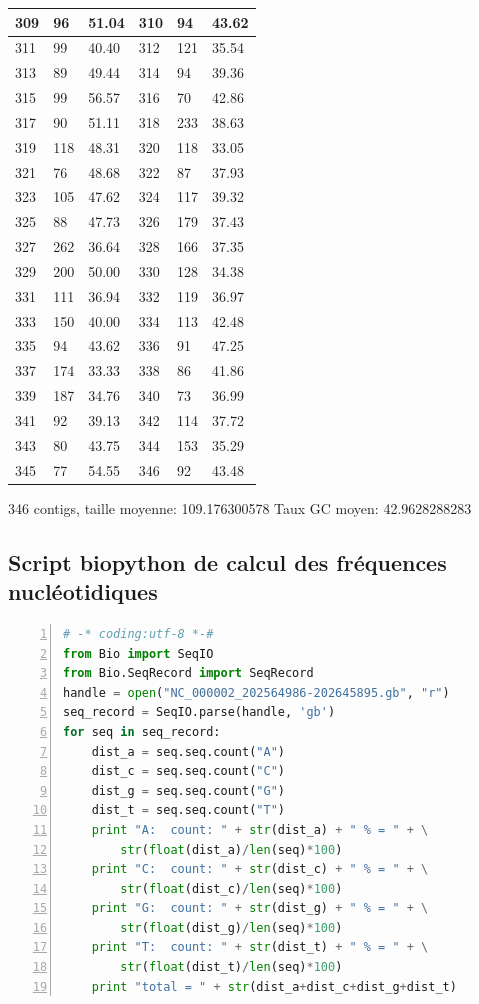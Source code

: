\documentclass[10.9pt]{article} %
\begin{document}
{\begin{longtable}{|p{2cm}|p{2cm}|p{2cm}|p{2cm}|p{2cm}|p{2cm}|}
\hline
309 & 96& 51.04 & 310 & 94& 43.62\\
\hline
311 & 99& 40.40 & 312 & 121& 35.54\\
\hline
313 & 89& 49.44 & 314 & 94& 39.36\\
\hline
315 & 99& 56.57 & 316 & 70& 42.86\\
\hline
317 & 90& 51.11 & 318 & 233& 38.63\\
\hline
319 & 118& 48.31 & 320 & 118& 33.05\\
\hline
321 & 76& 48.68 & 322 & 87& 37.93\\
\hline
323 & 105& 47.62 & 324 & 117& 39.32\\
\hline
325 & 88& 47.73 & 326 & 179& 37.43\\
\hline
327 & 262& 36.64 & 328 & 166& 37.35\\
\hline
329 & 200& 50.00 & 330 & 128& 34.38\\
\hline
331 & 111& 36.94 & 332 & 119& 36.97\\
\hline
333 & 150& 40.00 & 334 & 113& 42.48\\
\hline
335 & 94& 43.62 & 336 & 91& 47.25\\
\hline
337 & 174& 33.33 & 338 & 86& 41.86\\
\hline
339 & 187& 34.76 & 340 & 73& 36.99\\
\hline
341 & 92& 39.13 & 342 & 114& 37.72\\
\hline
343 & 80& 43.75 & 344 & 153& 35.29\\
\hline
345 & 77& 54.55 & 346 & 92& 43.48\\
\hline
\end{longtable}
}
346 contigs, taille moyenne: 109.176300578 Taux GC moyen: 42.9628288283



\subsection{Script biopython de calcul des fréquences nucléotidiques}\label{3}
\begin{lstlisting}[frame=single,numbers=left,language=Python]
# -* coding:utf-8 *-#
from Bio import SeqIO
from Bio.SeqRecord import SeqRecord
handle = open("NC_000002_202564986-202645895.gb", "r")
seq_record = SeqIO.parse(handle, 'gb')
for seq in seq_record:
    dist_a = seq.seq.count("A")
    dist_c = seq.seq.count("C")
    dist_g = seq.seq.count("G")
    dist_t = seq.seq.count("T")
    print "A:  count: " + str(dist_a) + " % = " + \
        str(float(dist_a)/len(seq)*100)
    print "C:  count: " + str(dist_c) + " % = " + \
        str(float(dist_c)/len(seq)*100)
    print "G:  count: " + str(dist_g) + " % = " + \
        str(float(dist_g)/len(seq)*100)
    print "T:  count: " + str(dist_t) + " % = " + \
        str(float(dist_t)/len(seq)*100)
    print "total = " + str(dist_a+dist_c+dist_g+dist_t)
\end{lstlisting}
\end{document}
